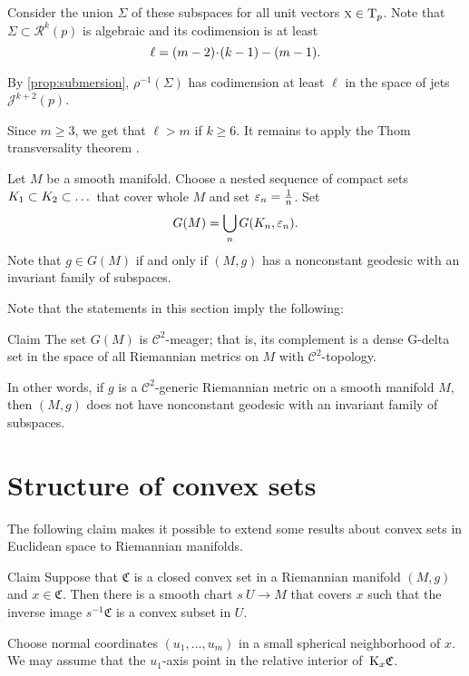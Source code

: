 \documentclass[a4paper,10pt]{article}
\begin{document}
Consider the union $\Sigma$ of these subspaces for all unit vectors $\text{\sc{x}}\in \mathrm{T}_p$.
Note that $\Sigma\subset \mathcal{R}^k(p)$ is algebraic and its codimension is at least 
\[\ell=(m-2)\z\cdot (k-1)-(m-1).\]

By \ref{prop:submersion}, $\rho^{-1}(\Sigma)$ has codimension at least $\ell$ in the space of jets $\mathcal{J}^{k+2}(p)$.

Since $m\ge 3$, we get that $\ell> m$ if $k\ge 6$.
It remains to apply the Thom transversality theorem \cite[2.3.2]{eliashberg-mishachev}.
\qeds

Let $M$ be a smooth manifold.
Choose a nested sequence of compact sets $K_1\z\subset K_2\subset \dots$ that cover whole $M$ and set $\varepsilon_n=\tfrac1n$.
Set 
\[G(M)=\bigcup_n G(K_n,\varepsilon_n).\]
Note that $g\in G(M)$ if and only if $(M,g)$ has a nonconstant geodesic with an invariant family of subspaces.

Note that the statements in this section imply the following:

\begin{thm}{Claim}\label{clm:meager}
The set $G(M)$ is $\mathcal{C}^2$-meager; that is, its complement is a dense G-delta set in the space of all Riemannian metrics on $M$ with $\mathcal{C}^2$-topology.

In other words, if $g$ is a $\mathcal C^2$-generic Riemannian metric on a smooth manifold $M$,
then $(M,g)$ does not have nonconstant geodesic with an invariant family of subspaces.
\end{thm}


\section{Structure of convex sets}

The following claim makes it possible to extend some results about convex sets in Euclidean space to Riemannian manifolds.

\begin{thm}{Claim}\label{clm:convex}
Suppose that $\mathfrak{C}$ is a closed convex set in a Riemannian manifold $(M,g)$ and $x\in \mathfrak{C}$.
Then there is a smooth chart $s\:U\to M$ that covers $x$ such that the inverse image $s^{-1}\mathfrak{C}$ is a convex subset in $U$.
\end{thm}

Choose normal coordinates $(u_1,\dots, u_m)$ in a small spherical neighborhood of $x$.
We may assume that the $u_1$-axis point in the relative interior of~$\mathrm{K}_x\mathfrak{C}$.
\end{document}

